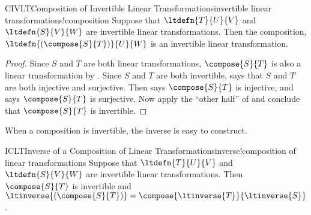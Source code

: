 %
\begin{theorem}{CIVLT}{Composition of Invertible Linear Transformations}{invertible linear transformations!composition}
Suppose that $\ltdefn{T}{U}{V}$ and $\ltdefn{S}{V}{W}$ are invertible linear transformations.  Then the composition, $\ltdefn{\left(\compose{S}{T}\right)}{U}{W}$ is an invertible linear transformation.
\end{theorem}
%
\begin{proof}
Since $S$ and $T$ are both linear transformations,  $\compose{S}{T}$ is also a linear transformation by .    Since $S$ and $T$ are both invertible,  says that $S$ and $T$ are both injective and surjective.  Then  says $\compose{S}{T}$ is injective, and  says $\compose{S}{T}$ is surjective.  Now apply the ``other half'' of  and conclude that $\compose{S}{T}$ is invertible.
\end{proof}
%
When a composition is invertible, the inverse is easy to construct.
%
\begin{theorem}{ICLT}{Inverse of a Composition of Linear Transformations}{inverse!composition of linear transformations}
Suppose that $\ltdefn{T}{U}{V}$ and $\ltdefn{S}{V}{W}$ are invertible linear transformations. Then $\compose{S}{T}$ is invertible and $\ltinverse{\left(\compose{S}{T}\right)}=\compose{\ltinverse{T}}{\ltinverse{S}}$.
\end{theorem}
%
